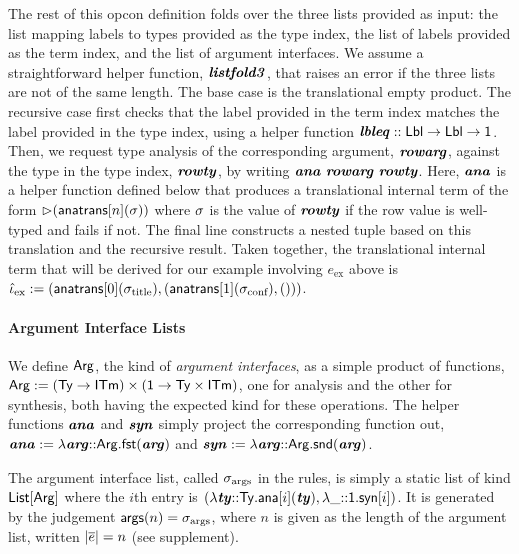 \documentclass[10pt,preprint]{sigplanconf}
\begin{document}
The rest of this opcon definition folds over the three lists provided as input: the list mapping labels to types provided as the type index, the list of labels provided as the term index, and the list of argument interfaces. We assume a straightforward helper function, ${\textbf{\textit{listfold3}}}$, that raises an error if the three lists are not of the same length. The base case is the translational empty product. The recursive case first checks that the label provided in the term index matches the label provided in the type index, using a helper function ${\textbf{\textit{lbleq}}} :: {\sf Lbl} \rightarrow {\sf Lbl} \rightarrow {\sf 1}$. Then, we request type analysis of the corresponding argument, ${\textbf{\textit{rowarg}}}$,  against the type in the type index, ${\textbf{\textit{rowty}}}$, by writing ${\textbf{\textit{ana}}}~{\textbf{\textit{rowarg}}}~{\textbf{\textit{rowty}}}$. Here, ${\textbf{\textit{ana}}}$ is a helper function defined below that produces a translational internal term  of the form ${\rhd}({\sf anatrans}[n](\sigma))$ where $\sigma$ is the value of ${\textbf{\textit{rowty}}}$ if the row value is well-typed and fails if not. The final line constructs a nested tuple based on this translation and the recursive result. Taken together, the translational internal term that will be derived for our example involving $e_\text{ex}$ above is $\small\qitm_\text{ex} := (\anatrans{0}{\stx{title}}, (\anatrans{1}{\stx{conf}}, ()))$.

\paragraph{Argument Interface Lists} We define ${\sf Arg}$, the kind of \emph{argument interfaces}, as a simple product of functions, ${\sf Arg} := ({\sf Ty} \rightarrow {\sf ITm}) \times ({\sf 1} \rightarrow {\sf Ty}\times{\sf ITm})$, one for analysis and the other for synthesis, both having the expected kind for these operations. The helper functions ${\textbf{\textit{ana}}}$ and ${\textbf{\textit{syn}}}$ simply project the corresponding function out, ${\textbf{\textit{ana}}} := \lambda {\textbf{\textit{arg}}}{::}{\sf Arg}.{\sf fst}({\textbf{\textit{arg}}})$ and ${\textbf{\textit{syn}}}  :=  \lambda {\textbf{\textit{arg}}}{::}{\sf Arg}.{\sf snd}({\textbf{\textit{arg}}})$. 

The argument interface list, called $\sigma_\text{args}$ in the rules, is simply a static list of kind ${\sf List}[{\sf Arg}]$ where the $i$th entry is $(\lambda {\textbf{\textit{ty}}}{::}{\sf Ty}.{\sf ana}[i]({\textbf{\textit{ty}}}), \lambda \_{::}{\sf 1}.{\sf syn}[i])$. It is generated by the judgement ${\sf args}(n)=\sigma_\text{args}$, where $n$ is given as the length of the argument list, written $|\overline{e}|=n$ (see supplement).



\end{document}
